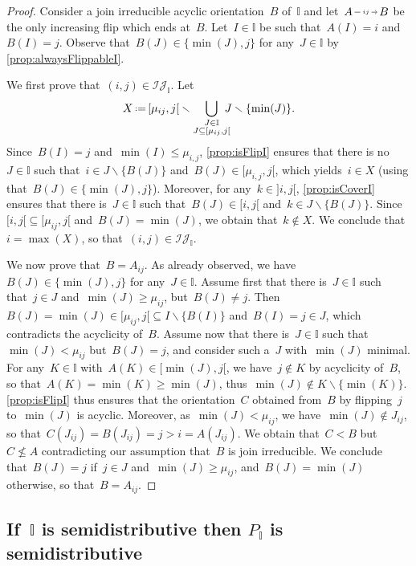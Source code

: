 \documentclass{amsart}
\theoremstyle{definition}
\newcommand{\cal}[1]{\mathcal{#1}} %
\newcommand{\ssm}{\smallsetminus} %
\newcommand{\eqdef}{\mbox{\,\raisebox{0.2ex}{\scriptsize\ensuremath{\mathrm:}}\ensuremath{=}\,}} %
\newcommand{\II}{\mathbb I} %
\newcommand{\cIJ}{\cal{IJ}} %
\newcommand{\flip}[4]{\ensuremath{#1 \, \begin{tikzpicture}[scale=1,baseline=-.1cm] \path[->]  (0,0) edge node[fill=white,inner sep=2pt, font=\tiny ] {$#2#3$} (.7,0); \end{tikzpicture} \, #4}}
\begin{document}
\begin{proof}
Consider a join irreducible acyclic orientation~$B$ of~$\II$ and let~$\flip{A}{i}{j}{B}$ be the only increasing flip which ends at~$B$.
Let~$I \in \II$ be such that~$A(I) = i$ and~$B(I) = j$.
Observe that~$B(J) \in \{\min(J), j\}$ for any~$J \in \II$ by \cref{prop:alwaysFlippableI}.

We first prove that~$(i,j) \in \cIJ_\II$.
Let
\[
X \eqdef {[\mu_{ij},j[} \ssm \bigcup_{\substack{J \in \II \\ J \subseteq {[\mu_{ij}, j[}}} \!\!\!\! J \ssm \{\min(J)\}.
\]
Since~$B(I) = j$ and~$\min(I) \le \mu_{i,j}$, \cref{prop:isFlipI} ensures that there is no~$J \in \II$ such that~${i \in J \ssm \{B(J)\}}$ and~$B(J) \in {[\mu_{i,j}, j[}$, which yields~$i \in X$ (using that~$B(J) \in \{\min(J),j\}$).
Moreover, for any~$k \in {]i,j[}$, \cref{prop:isCoverI} ensures that there is~$J \in \II$ such that~$B(J) \in {[i,j[}$ and~$k \in J \ssm \{B(J)\}$.
Since~${[i,j[} \subseteq {[\mu_{ij},j[}$ and~$B(J) = \min(J)$, we obtain that~$k \notin X$.
We conclude that~$i = \max(X)$, so that~$(i,j) \in \cIJ_\II$.

We now prove that~$B = A_{ij}$.
As already observed, we have~$B(J) \in \{\min(J), j\}$ for any~${J \in \II}$.
Assume first that there is~$J \in \II$ such that~$j \in J$ and~$\min(J) \ge \mu_{ij}$, but~$B(J) \ne j$.
Then ${B(J) = \min(J) \in {[\mu_{ij}, j[} \subseteq I \ssm \{B(I)\}}$ and~$B(I) = j \in J$, which contradicts the acyclicity of~$B$.
Assume now that there is~$J \in \II$ such that~$\min(J) < \mu_{ij}$ but~${B(J) = j}$, and consider such a~$J$ with~$\min(J)$ minimal.
For any~$K \in \II$ with~$A(K) \in {[\min(J),j[}$, we have~$j \notin K$ by acyclicity of~$B$, so that~${A(K) = \min(K) \ge \min(J)}$, thus~${\min(J) \notin K \ssm \{\min(K)\}}$.
\cref{prop:isFlipI} thus ensures that the orientation~$C$ obtained from~$B$ by flipping~$j$ to~$\min(J)$ is acyclic.
Moreover, as~$\min(J) < \mu_{ij}$, we have~$\min(J) \notin J_{ij}$, so that~$C(J_{ij}) = B(J_{ij}) = j > i = A(J_{ij})$.
We obtain that~$C < B$ but~$C \not\le A$ contradicting our assumption that~$B$ is join irreducible.
We conclude that~$B(J) = j$ if~$j \in J$ and~$\min(J) \ge \mu_{ij}$, and~$B(J) = \min(J)$ otherwise, so that~$B = A_{ij}$.
\end{proof}


\subsection{If~$\II$ is semidistributive then $P_\II$ is semidistributive}
\label{subsec:semidistributiveLatticeBackward}
\end{document}
